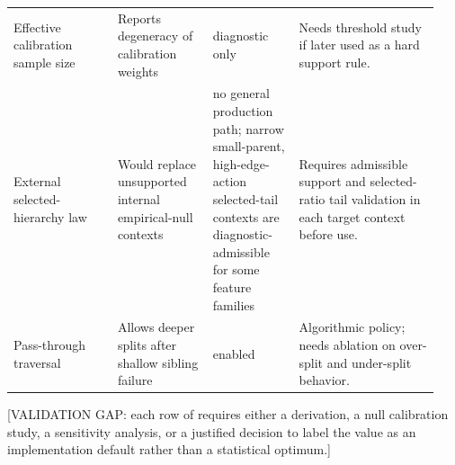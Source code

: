 \begin{longtable}{@{}>{\raggedright\arraybackslash}p{0.23\linewidth}>{\raggedright\arraybackslash}p{0.21\linewidth}>{\raggedright\arraybackslash}p{0.19\linewidth}>{\raggedright\arraybackslash}p{0.31\linewidth}@{}}
Effective calibration sample size & Reports degeneracy of calibration weights & diagnostic only & Needs threshold study if later used as a hard support rule. \\
External selected-hierarchy law & Would replace unsupported internal empirical-null contexts & no general production path; narrow small-parent, high-edge-action selected-tail contexts are diagnostic-admissible for some feature families & Requires admissible support and selected-ratio tail validation in each target context before use. \\
Pass-through traversal & Allows deeper splits after shallow sibling failure & enabled & Algorithmic policy; needs ablation on over-split and under-split behavior. \\
\bottomrule
\end{longtable}
\endgroup

[VALIDATION GAP: each row of  requires either a
derivation, a null calibration study, a sensitivity analysis, or a justified
decision to label the value as an implementation default rather than a
statistical optimum.]
